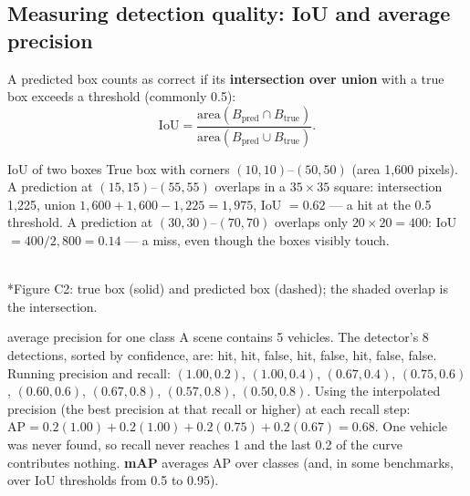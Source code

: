 \documentclass[11pt]{article}
\begin{document}
\subsection{Measuring detection quality: IoU and average precision}
A predicted box counts as correct if its \textbf{intersection over union} with a true box exceeds a threshold (commonly 0.5):
\[\text{IoU}=\frac{\text{area}(B_{\text{pred}}\cap B_{\text{true}})}{\text{area}(B_{\text{pred}}\cup B_{\text{true}})}.\]
\begin{example}{IoU of two boxes}
True box with corners $(10,10)$--$(50,50)$ (area 1,600 pixels). A prediction at $(15,15)$--$(55,55)$ overlaps in a $35\times35$ square: intersection 1,225, union $1{,}600+1{,}600-1{,}225=1{,}975$, IoU $=0.62$ --- a hit at the 0.5 threshold. A prediction at $(30,30)$--$(70,70)$ overlaps only $20\times20=400$: IoU $=400/2{,}800=0.14$ --- a miss, even though the boxes visibly touch.
\end{example}
\begin{center}\\*{\small\color{GreyN}Figure C2: true box (solid) and predicted box (dashed); the shaded overlap is the intersection.}\end{center}

\begin{example}{average precision for one class}
A scene contains 5 vehicles. The detector's 8 detections, sorted by confidence, are: hit, hit, false, hit, false, hit, false, false. Running precision and recall: $(1.00,0.2)$, $(1.00,0.4)$, $(0.67,0.4)$, $(0.75,0.6)$, $(0.60,0.6)$, $(0.67,0.8)$, $(0.57,0.8)$, $(0.50,0.8)$. Using the interpolated precision (the best precision at that recall or higher) at each recall step: $\text{AP}=0.2(1.00)+0.2(1.00)+0.2(0.75)+0.2(0.67)=0.68$. One vehicle was never found, so recall never reaches 1 and the last 0.2 of the curve contributes nothing. \textbf{mAP} averages AP over classes (and, in some benchmarks, over IoU thresholds from 0.5 to 0.95).
\end{example}
\end{document}
